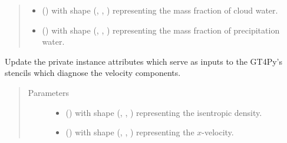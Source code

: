 \documentclass[letterpaper,10pt,english]{sphinxmanual}
\begin{document}
\begin{fulllineitems}
\begin{fulllineitems}
\begin{quote}
\begin{description}
\begin{itemize}
\item {} 
 () \textendash{}  with shape (, , ) representing the mass fraction of
cloud water.

\item {} 
 () \textendash{}  with shape (, , ) representing the mass fraction of
precipitation water.

\end{itemize}

\end{description}\end{quote}

\end{fulllineitems}


\begin{fulllineitems}
\label{\detokenize{api:dycore.diagnostic_isentropic.DiagnosticIsentropic._stencils_diagnosing_velocity_set_inputs}}
Update the private instance attributes which serve as inputs to the GT4Py’s stencils which diagnose
the velocity components.
\begin{quote}\begin{description}
\item[{Parameters}] \leavevmode\begin{itemize}
\item {} 
 () \textendash{}  with shape (, , ) representing the isentropic density.

\item {} 
 () \textendash{}  with shape (, , ) representing the \(x\)-velocity.


\end{itemize}
\end{description}
\end{quote}
\end{fulllineitems}
\end{fulllineitems}
\end{document}
